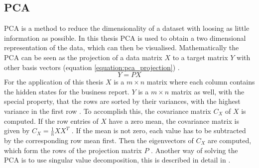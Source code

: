 \FloatBarrier
\subsection{\acl{PCA}}
\acl{PCA} is a method to reduce the dimensionality of a dataset with loosing as little information as possible.
In this thesis \ac{PCA} is used to obtain a two dimensional representation of the data, which can then be visualised.
Mathematically the \ac{PCA} can be seen as the projection of a data matrix $X$ to a target matrix $Y$ with other basis vectors (equation \ref{equation:pca_projection}) \cite[p. 3]{Shlens2014}.
\begin{equation}
    Y=PX
    \label{equation:pca_projection}
\end{equation}
For the application of this thesis $X$ is a $m\times n$ matrix where each column contains the hidden states for the business report.
$Y$ is a $m\times n$ matrix as well, with the special property, that the rows are sorted by their variances, with the highest variance in the first row \cite[p. 5]{Shlens2014}.
To accomplish this, the covariance matrix $C_X$ of $X$ is computed.
If the row entries of $X$ have a zero mean, the covariance matrix is given by $C_X=\frac{1}{n}XX^T$ \cite[p. 5]{Shlens2014}.
If the mean is not zero, each value has to be subtracted by the corresponding row mean first.
Then the eigenvectors of $C_X$ are computed, which form the rows of the projection matrix $P$ \cite[p. 6]{Shlens2014}.
Another way of solving the \ac{PCA} is to use singular value decomposition, this is described in detail in \cite[p. 7]{Shlens2014}.


